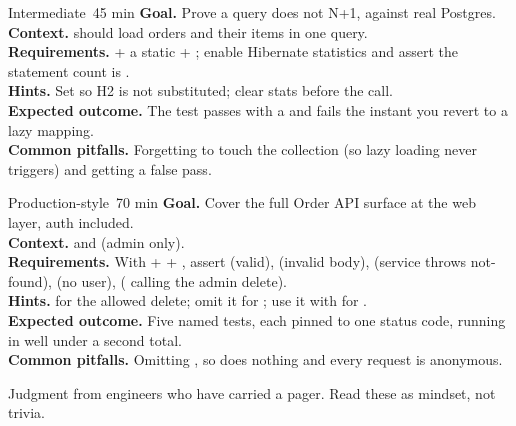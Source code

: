 \begin{minilab}{Intermediate}{~45 min}
\textbf{Goal.} Prove a query does not N+1, against real Postgres.\\
\textbf{Context.}  should load orders and their items in one query.\\
\textbf{Requirements.}  + a static  + ; enable Hibernate statistics and assert the statement count is .\\
\textbf{Hints.} Set  so H2 is not substituted; clear stats before the call.\\
\textbf{Expected outcome.} The test passes with a  and fails the instant you revert to a lazy mapping.\\
\textbf{Common pitfalls.} Forgetting to touch the collection (so lazy loading never triggers) and getting a false pass.
\end{minilab}

\begin{minilab}{Production-style}{~70 min}
\textbf{Goal.} Cover the full Order API surface at the web layer, auth included.\\
\textbf{Context.}  and  (admin only).\\
\textbf{Requirements.} With  +  + , assert  (valid),  (invalid body),  (service throws not-found),  (no user),  ( calling the admin delete).\\
\textbf{Hints.}  for the allowed delete; omit it for ; use it with  for .\\
\textbf{Expected outcome.} Five named tests, each pinned to one status code, running in well under a second total.\\
\textbf{Common pitfalls.} Omitting , so  does nothing and every request is anonymous.
\end{minilab}


Judgment from engineers who have carried a pager. Read these as mindset, not trivia.

